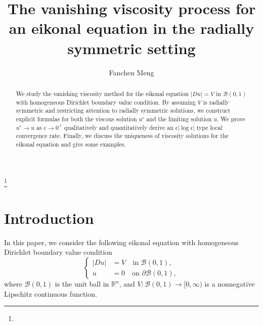 \documentclass[12pt,reqno]{amsart}
\numberwithin{figure}{section}
\theoremstyle{plain}
\numberwithin{equation}{section}
\newcommand{\cB}{\mathcal{B}}
\begin{document}
\title
{The vanishing viscosity process for an eikonal equation in the radially symmetric setting}

\pagestyle{fancy}
\fancyhf{}  
\fancyhead[LE]{\footnotesize \thepage}  
\fancyhead[RO]{\footnotesize \thepage}  
\renewcommand{\headrulewidth}{0pt}

\author
{Fanchen Meng}

\thanks{
}



\address
{
Department of Mathematics, 
Cornell University,  212 Garden Ave, Ithaca, NY 14853, USA}



\maketitle
\begin{abstract}
    We study the vanishing viscosity method for the eikonal equation $|Du|=V$ in $\cB(0,1)$ with homogeneous Dirichlet boundary value condition. By assuming $V$ is radially symmetric and restricting attention to radially symmetric solutions, we construct explicit formulas for both the viscous solution $u^{\epsilon}$ and the limiting solution $u$. We prove $u^{\epsilon}\rightarrow u$ as $\epsilon \rightarrow 0^+$ qualitatively and quantitatively derive an $\epsilon |\log \epsilon|$ type local convergence rate. Finally, we discuss the uniqueness of viscosity solutions for the eikonal equation and give some examples. 
\end{abstract}
\section{Introduction}
In this paper, we consider the following eikonal equation with homogeneous Dirichlet boundary value condition
\begin{equation}\label{eikonal}
\left\{
\begin{aligned}
|Du| &= V \quad \text{in } \cB(0,1), \\
u &= 0 \quad \text{on } \partial \cB(0,1),
\end{aligned} 
\right.
\end{equation}
where $\cB(0,1) $ is the unit ball in $\mathbb{R}^n$, and $V: \cB(0,1) \rightarrow [0,\infty) $ is a nonnegative Lipschitz continuous function.
\end{document}
